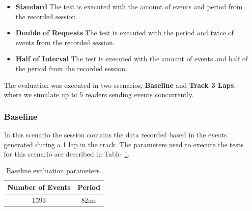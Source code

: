 \begin{itemize}
  \item\textbf{Standard} The test is executed with the amount of events and period from the recorded session.
  \item\textbf{Double of Requests} The test is executed with the period and twice of events from the recorded
  session.
  \item\textbf{Half of Interval} The test is executed with the amount of events and half of the period from
  the recorded session.
\end{itemize}

The evaluation was executed in two scenarios, \textbf{Baseline} and \textbf{Track 3 Laps}, where we
simulate up to 5 readers sending events concurrently.

\subsubsection{Baseline}
\label{subs:eval_exp_data_baseline}
In this scenario the session contains the data recorded based in the events generated during a 1 lap
in the track. The parameters used to execute the tests for this scenario are described in Table~\ref{tab:baseline_parameters}.

\begin{table}[ht!]
  \begin{tabular}{|c|c|}
    \hline
    Number of Events & Period \\ \hline
    1593             & 82ms   \\ \hline
  \end{tabular}
  \caption{Baseline evaluation parameters.}
  \label{tab:baseline_parameters}
\end{table}


